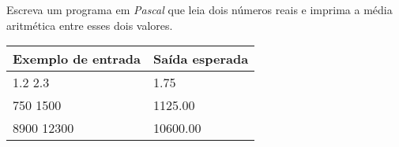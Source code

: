 \item Escreva um programa em \emph{Pascal} que leia dois números reais e 
imprima a média aritmética entre esses dois valores.

\begin{center}
\begin{tabular}{|l|l|} \hline
Exemplo de entrada & Saída esperada \\ \hline
1.2 2.3         & 1.75 \\ \hline
750 1500        & 1125.00  \\ \hline
8900 12300      & 10600.00 \\ \hline
\end{tabular}
\end{center}